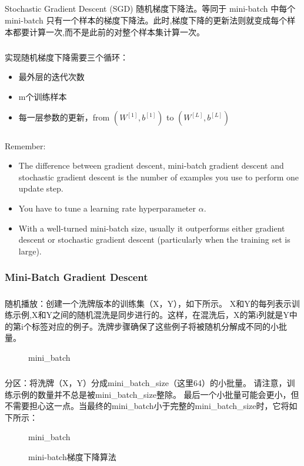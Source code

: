 \documentclass{article}
\begin{document}
\begin{CJK}{UTF8}{gbsn}
\begin{itemize}
\end{itemize}
\subparagraph{}
Stochastic Gradient Descent (SGD) 随机梯度下降法。等同于 mini-batch 中每个 mini-batch 只有一个样本的梯度下降法。此时,梯度下降的更新法则就变成每个样本都要计算一次,而不是此前的对整个样本集计算一次。
\subparagraph{}
实现随机梯度下降需要三个循环：
\begin{itemize}
\item 最外层的迭代次数
\item m个训练样本
\item 每一层参数的更新，from $(W^{[1]},b^{[1]})$ to $(W^{[L]},b^{[L]})$
\end{itemize}
\subparagraph{}
Remember:
\begin{itemize}
\item The difference between gradient descent, mini-batch gradient descent and stochastic gradient descent is the number of examples you use to perform one update step.
\item You have to tune a learning rate hyperparameter $\alpha$.
\item With a well-turned mini-batch size, usually it outperforms either gradient descent or stochastic gradient descent (particularly when the training set is large).
\end{itemize}
\subsubsection{Mini-Batch Gradient Descent}
\subparagraph{}
随机播放：创建一个洗牌版本的训练集（X，Y），如下所示。 X和Y的每列表示训练示例,X和Y之间的随机混洗是同步进行的。这样，在混洗后，X的第i列就是Y中的第i个标签对应的例子。洗牌步骤确保了这些例子将被随机分解成不同的小批量。
\begin{figure}[H]
\label{fig:41}
\caption{mini\_{}batch}
\end{figure}
\subparagraph{}
分区：将洗牌（X，Y）分成mini\_{}batch\_{}size（这里64）的小批量。 请注意，训练示例的数量并不总是被mini\_{}batch\_{}size整除。 最后一个小批量可能会更小，但不需要担心这一点。当最终的mini\_{}batch小于完整的mini\_{}batch\_{}size时，它将如下所示：
\begin{figure}[H]
\label{fig:40}
\caption{mini\_{}batch}
\end{figure}
\begin{figure}[H]
\label{fig:42}
\caption{mini-batch梯度下降算法}
\end{figure}

\end{CJK}
\end{document}
